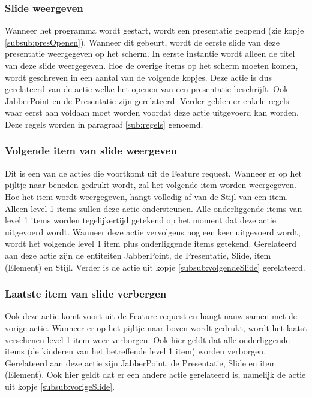 \documentclass[a4paper]{article}
\newcommand{\1}[0]{\'{e}\'{e}n}
\begin{document}
\subsubsection{Slide weergeven}
\label{subsub:slideTonen}
Wanneer het programma wordt gestart, wordt een presentatie geopend (zie kopje \ref{subsub:presOpenen}). Wanneer dit gebeurt, wordt de eerste slide van deze presentatie weergegeven op het scherm. In eerste instantie wordt alleen de titel van deze slide weergegeven. Hoe de overige items op het scherm moeten komen, wordt geschreven in een aantal van de volgende kopjes. Deze actie is dus gerelateerd van de actie welke het openen van een presentatie beschrijft. Ook JabberPoint en de Presentatie zijn gerelateerd. Verder gelden er enkele regels waar eerst aan voldaan moet worden voordat deze actie uitgevoerd kan worden. Deze regels worden in paragraaf \ref{sub:regels} genoemd.

\subsubsection{Volgende item van slide weergeven}
\label{subsub:volgendeItem}
Dit is een van de acties die voortkomt uit de Feature request. Wanneer er op het pijltje naar beneden gedrukt wordt, zal het volgende item worden weergegeven. Hoe het item wordt weergegeven, hangt volledig af van de Stijl van een item. Alleen level 1 items zullen deze actie ondersteunen. Alle onderliggende items van level 1 items worden tegelijkertijd getekend op het moment dat deze actie uitgevoerd wordt. Wanneer deze actie vervolgens nog een keer uitgevoerd wordt, wordt het volgende level 1 item plus onderliggende items getekend. Gerelateerd aan deze actie zijn de entiteiten JabberPoint, de Presentatie, Slide, item (Element) en Stijl. Verder is de actie uit kopje \ref{subsub:volgendeSlide} gerelateerd.

\subsubsection{Laatste item van slide verbergen}
\label{subsub:vorigeItem}
Ook deze actie komt voort uit de Feature request en hangt nauw samen met de vorige actie. Wanneer er op het pijltje naar boven wordt gedrukt, wordt het laatst verschenen level 1 item weer verborgen. Ook hier geldt dat alle onderliggende items (de kinderen van het betreffende level 1 item) worden verborgen. Gerelateerd aan deze actie zijn JabberPoint, de Presentatie, Slide en item (Element). Ook hier geldt dat er een andere actie gerelateerd is, namelijk de actie uit kopje \ref{subsub:vorigeSlide}.
\end{document}
